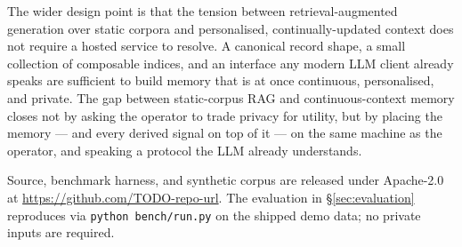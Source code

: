 The wider design point is that the tension between retrieval-augmented generation over static corpora and personalised, continually-updated context does not require a hosted service to resolve. A canonical record shape, a small collection of composable indices, and an interface any modern LLM client already speaks are sufficient to build memory that is at once continuous, personalised, and private. The gap between static-corpus RAG and continuous-context memory closes not by asking the operator to trade privacy for utility, but by placing the memory --- and every derived signal on top of it --- on the same machine as the operator, and speaking a protocol the LLM already understands.

Source, benchmark harness, and synthetic corpus are released under Apache-2.0 at \url{https://github.com/TODO-repo-url}. The evaluation in \S\ref{sec:evaluation} reproduces via \verb|python bench/run.py| on the shipped demo data; no private inputs are required.
